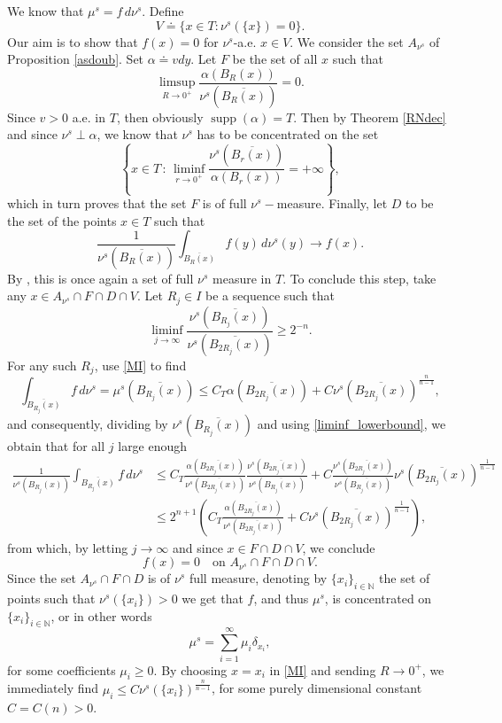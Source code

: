 \documentclass[10pt,reqno]{amsart}
\numberwithin{equation}{section}
\newcommand{\N}{\mathbb{N}}
\DeclareMathOperator{\spt}{supp}
\theoremstyle{plain}
\theoremstyle{definition}
\theoremstyle{remark}
\begin{document}
We know that $\mu^s = f\,d\nu^s$. Define
\[
V \doteq \big\{x \in T: \nu^s(\{x\}) = 0\big\}.
\]
Our aim is to show that $f(x) = 0$ for $\nu^s$-a.e. $x \in V$. We consider the set $A_{\nu^s}$ of Proposition \ref{asdoub}. Set $\alpha \doteq vdy$. Let $F$ be the set of all $x$ such that
\[
\limsup_{R \to 0^+}\frac{\alpha(B_R(x))}{\nu^s(\overline{B_R(x)})} = 0.
\]
Since $v>0$ a.e. in $T$, then obviously $\spt (\alpha)=T$. Then by Theorem \ref{RNdec} and since $\nu^s \perp \alpha$, we know that $\nu^s$ has to be concentrated on the set 
$$
\left\{x \in T \,:\, \liminf_{r \to 0^+}\frac{\nu^s(\overline{B_r(x)})}{\alpha(B_r(x))} = + \infty\right\},
$$
which in turn proves that the set $F$ is of full $\nu^s-$measure. Finally, let $D$ to be the set of the points $x \in T$ such that
\[
\frac{1}{\nu^s(\overline{B_R(x)})}\int_{\overline{B_R(x)}}f(y)\,d\nu^s(y) \to f(x).
\]
By \cite[Thm. 1.32]{EVG}, this is once again a set of full $\nu^s$ measure in $T$. To conclude this step, take any $x \in A_{\nu^s}\cap F\cap D \cap V$. Let $R_j \in I$ be a sequence such that
\begin{equation}\label{liminf_lowerbound}
\liminf_{j\rightarrow \infty} \frac{{\nu^s}(\overline{B_{R_j}(x)})}{{\nu^s}(\overline{B_{2R_j}(x)})} \ge 2^{-n}.
\end{equation}
 For any such $R_j$, use \eqref{MI} to find
$$
\int_{\overline{B_{R_j}(x)}} f\,d\nu^s=\mu^s(\overline{B_{R_j}(x)})\leq C_T \alpha(\overline{B_{2R_j}(x)})+C\nu^s(\overline{B_{2R_j}(x)})^\frac{n}{n-1},
$$
and consequently, dividing by $\nu^s(\overline{B_{R_j}(x)})$ and using \eqref{liminf_lowerbound}, we obtain that for all $j$ large enough
\begin{align}
\frac{1}{\nu^s(B_{R_j}(x))}\int_{\overline{B_{R_j}(x)}} f\,d\nu^s&\leq C_T\frac{\alpha(\overline{B_{2R_j}(x)})}{\nu^s(\overline{B_{2R_j}(x)})} \frac{\nu^s(\overline{B_{2R_j}(x)})}{\nu^s(\overline{B_{R_j}(x)})}+ C \frac{\nu^s(\overline{B_{2R_j}(x)})}{\nu^s(\overline{B_{R_j}(x)})}   \nu^s(\overline{B_{2R_j}(x)})^\frac{1}{n-1} \nonumber \\
&\leq 2^{n+1}  \left(C_T\frac{\alpha(\overline{B_{2R_j}(x)})}{\nu^s(\overline{B_{2R_j}(x)})} + C  \nu^s(\overline{B_{2R_j}(x)})^\frac{1}{n-1}  \right)\label{almost_done}, 
\end{align}
from which, by letting $j\rightarrow \infty$ and since $x \in  F\cap D \cap V$,  we conclude
$$
f(x)=0 \quad \text{on } A_{\nu^s}\cap F\cap D \cap V.
$$
Since the set $A_{\nu^s}\cap F\cap D$ is of $\nu^s$ full measure, denoting by $\{x_i\}_{i\in \N}$ the set of points such that $\nu^s(\{x_i\})>0$ we get that $f$, and thus $\mu^s$, is concentrated on $\{x_i\}_{i\in \N}$, or in other words
$$
\mu^s=\sum_{i=1}^\infty \mu_i \delta_{x_i},
$$
for some coefficients $\mu_i\geq 0$. By choosing $x = x_i$ in \eqref{MI} and sending $R \to 0^+$, we immediately find
$\mu_i\leq C\nu^s(\{x_i\})^\frac{n}{n-1}$, 
for some purely dimensional constant $C=C(n)>0$.
\end{document}
